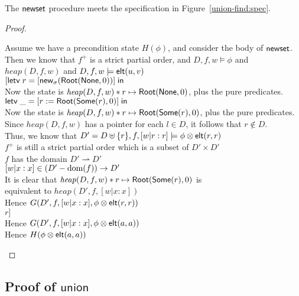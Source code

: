 \begin{lemma}
The $\mathsf{newset}$ procedure meets the specification in Figure~\ref{union-find:spec}. 
\end{lemma}

\begin{proof}
\begin{tabbedproof}
\oo Assume we have a precondition state $H(\phi)$, and consider the body of $\mathsf{newset}$. \\
\ooo Then we know that $f^+$ is a strict partial order, and $D,f,w \models \phi$ and \\
\oox $\mathit{heap}(D,f,w)$ and $D,f,w \models \mathsf{elt}({u}, {v})$ \\
\ooo $[\mathsf{letv}\;r = [\mathsf{new}_{\sigma}(\mathsf{Root}(\mathsf{None}, 0))]\;\mathsf{in}\;$ \\
\ooo Now the state is $\mathit{heap}(D,f,w) * r \mapsto \mathsf{Root}(\mathsf{None}, 0)$, plus the pure predicates. \\
\ooo $\mathsf{letv}\;\_ = [r := \mathsf{Root}(\mathsf{Some}(r), 0)]\;\mathsf{in}\;$ \\
\ooo Now the state is $\mathit{heap}(D,f,w) * r \mapsto \mathsf{Root}(\mathsf{Some}(r), 0)$, plus the pure predicates. \\
\ooo Since $\mathit{heap}(D,f,w)$ has a pointer for each $l \in D$, it follows that $r \not \in D$. \\
\ooo Thus, we know that $D' = D \uplus \{{r}\}, f, [w|r:r] \models \phi \otimes \mathsf{elt}({r}, {r})$ \\ 
\ooo $f^+$ is still a strict partial order which is a subset of $D' \times D'$ \\
\ooo $f$ has the domain $D' \rightharpoonup D'$ \\
\ooo $[w|x:x] \in (D' - \mbox{dom}({f})) \to D'$ \\
\ooo It is clear that $\mathit{heap}(D,f,w) * r \mapsto \mathsf{Root}(\mathsf{Some}(r), 0)$ is \\
\oox equivalent to $\mathit{heap}(D', f, [w|x:x])$ \\
\ooo Hence $G(D', f, [w|x:x], \phi \otimes \mathsf{elt}({r}, {r}))$ \\
\ooo $r]$ \\
\ooo Hence $G(D', f, [w|x:x], \phi \otimes \mathsf{elt}({a}, {a}))$ \\
\ooo Hence $H(\phi \otimes \mathsf{elt}({a}, {a}))$ 
\end{tabbedproof}
\end{proof}

\subsection{Proof of $\mathsf{union}$}

